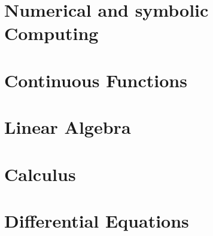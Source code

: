 \documentclass[a4paper]{report}
\begin{document}
\maketitle
\tableofcontents
\setcounter{section}{0}


\chapter{Numerical and symbolic Computing}

\chapter{Continuous Functions}

\chapter{Linear Algebra}

\chapter{Calculus}

\chapter{Differential Equations}

\end{document}
